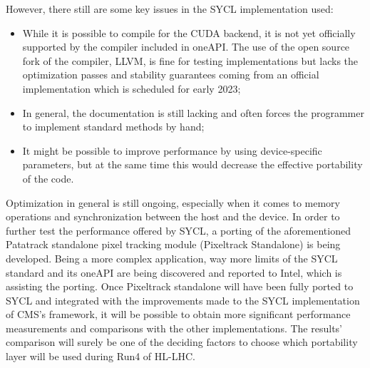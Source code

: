 However, there still are some key issues in the SYCL implementation used:
\begin{itemize}
    \item While it is possible to compile for the CUDA backend, it is not yet officially supported by the compiler included in oneAPI. The use of the open source fork of the compiler, LLVM, is fine for testing implementations but lacks the optimization passes and stability guarantees coming from an official implementation which is scheduled for early 2023;
    \item In general, the documentation is still lacking and often forces the programmer to implement standard methods by hand;
    \item It might be possible to improve performance by using device-specific parameters, but at the same time this would decrease the effective portability of the code.
\end{itemize}

Optimization in general is still ongoing, especially when it comes to memory operations and synchronization between the host and the device. In order to further test the performance offered by SYCL, a porting of the aforementioned Patatrack standalone pixel tracking module \cite{pixeltrack} (Pixeltrack Standalone) is being developed. Being a more complex application, way more limits of the SYCL standard and its oneAPI are being discovered and reported to Intel, which is assisting the porting. Once Pixeltrack standalone will have been fully ported to SYCL and integrated with the improvements made to the SYCL implementation of CMS's framework, it will be possible to obtain more significant performance measurements and comparisons with the other implementations. The results' comparison will surely be one of the deciding factors to choose which portability layer will be used during Run4 of HL-LHC.